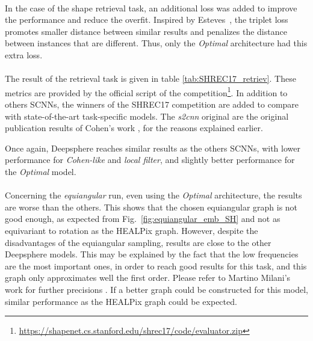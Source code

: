 \documentclass[11pt]{report}
\begin{document}
\paragraph*{}
In the case of the shape retrieval task, an additional loss was added to improve the performance and reduce the overfit. Inspired by Esteves~\cite{esteves_learning_2017}, the triplet loss promotes smaller distance between similar results and penalizes the distance between instances that are different. Thus, only the \emph{Optimal} architecture had this extra loss.

\paragraph*{}
The result of the retrieval task is given in table \ref{tab:SHREC17_retriev}. These metrics are provided by the official script of the competition\footnote{\url{https://shapenet.cs.stanford.edu/shrec17/code/evaluator.zip}}. In addition to others SCNNs, the winners of the SHREC17 competition are added to compare with state-of-the-art task-specific models. The \emph{s2cnn} original are the original publication results of Cohen's work \cite{cohen_spherical_2018}, for the reasons explained earlier.

Once again, Deepsphere reaches similar results as the others SCNNs, with lower performance for \emph{Cohen-like} and \emph{local filter}, and slightly better performance for the \emph{Optimal} model.

\paragraph*{}
Concerning the \emph{equiangular} run, even using the \emph{Optimal} architecture, the results are worse than the others. This shows that the chosen equiangular graph is not good enough, as expected from Fig.~\ref{fig:equiangular_emb_SH} and not as equivariant to rotation as the HEALPix graph. However, despite the disadvantages of the equiangular sampling, results are close to the other Deepsphere models. This may be explained by the fact that the low frequencies are the most important ones, in order to reach good results for this task, and this graph only approximates well the first order. Please refer to Martino Milani's work for further precisions \cite{milani_about_nodate}. If a better graph could be constructed for this model, similar performance as the HEALPix graph could be expected.
\end{document}
